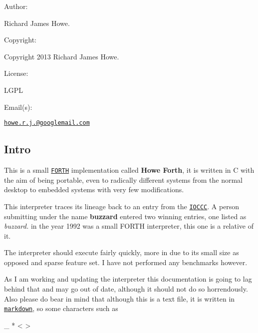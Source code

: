 

Author\-:


\begin{DoxyItemize}
\item Richard James Howe.
\end{DoxyItemize}

Copyright\-:


\begin{DoxyItemize}
\item Copyright 2013 Richard James Howe.
\end{DoxyItemize}

License\-:


\begin{DoxyItemize}
\item L\-G\-P\-L
\end{DoxyItemize}

Email(s)\-:


\begin{DoxyItemize}
\item \href{mailto:howe.r.j.89@googlemail.com}{\tt howe.\-r.\-j.@googlemail.\-com}
\end{DoxyItemize}

\subsection*{Intro}

This is a small \href{https://en.wikipedia.org/wiki/FORTH}{\tt F\-O\-R\-T\-H} implementation called {\bfseries Howe Forth}, it is written in C with the aim of being portable, even to radically different systems from the normal desktop to embedded systems with very few modifications.

This interpreter traces its lineage back to an entry from the \href{http://www.ioccc.org/winners.html}{\tt I\-O\-C\-C\-C}. A person submitting under the name {\bfseries buzzard} entered two winning entries, one listed as {\itshape buzzard.} in the year 1992 was a small F\-O\-R\-T\-H interpreter, this one is a relative of it.

The interpreter should execute fairly quickly, more in due to its small size as opposed and sparse feature set. I have not performed any benchmarks however.

As I am working and updating the interpreter this documentation is going to lag behind that and may go out of date, although it should not do so horrendously. Also please do bear in mind that although this is a text file, it is written in \href{http://daringfireball.net/projects/markdown/}{\tt markdown}, so some characters such as \begin{DoxyVerb}_ * < > \ 
\end{DoxyVerb}


